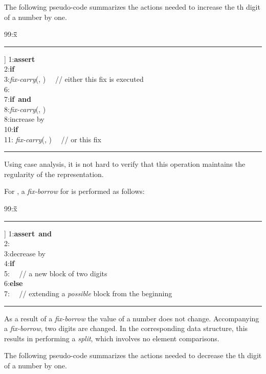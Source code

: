 \documentclass{llncs}
\newenvironment{algorithm}{\par\vspace*{-2mm}\quad\begin{minipage}[t]{0.925\textwidth}\begin{tabbing}99:x\=\quad\=\quad\=\quad\=\quad\=\quad\=\kill}{\end{tabbing}\end{minipage}\par\vspace*{-3mm}}
\newcommand{\ASSERT}{\textbf{assert}\ }
\newcommand{\IF}{\textbf{if}\ }
\newcommand{\ELSE}{\textbf{else}\ }
\newcommand{\AND}{\textbf{and}\ }
\begin{document}
The following pseudo-code summarizes the actions needed to increase
the th digit of a number by one.

\begin{center}
\begin{algorithm}
\rule[6pt]{\textwidth}{0.45pt}\-6pt]
1:\>\ASSERT \\
2:\>\IF \\
3:\>\>\textit{fix-carry}(, )
~~// either this fix is executed\\
6:\>\\
7:\>\IF  \AND \\
8:\>\>\textit{fix-carry}(, )\\
8:\>increase  by \\
10:\>\IF \\
11:\>\> \textit{fix-carry}(,
) ~~// or this fix\\
\rule[6pt]{\textwidth}{0.45pt}
\end{algorithm}
\end{center}

\noindent
Using case analysis, it is not hard to verify that this operation maintains the
regularity of the representation.

For , a \emph{fix-borrow} for  is performed as follows: 

\begin{center}
\begin{algorithm}
\rule[6pt]{\textwidth}{0.45pt}\-6pt]
1:\>\ASSERT  \AND \\
2:\>\\
3:\>decrease  by \\
4:\>\IF \\ 
5:\>\>  ~~// a new block of two digits\\
6:\>\ELSE\\
7:\>\> ~~// extending a \emph{possible} block from the beginning\\ 
\rule[6pt]{\textwidth}{0.45pt}
\end{algorithm}
\end{center}

\noindent
As a result of a {\it fix-borrow} the value of a number does not change.
Accompanying a {\it fix-borrow}, two digits are changed. In the
corresponding data structure, this results in performing a
\emph{split}, which involves no element comparisons.

The following pseudo-code summarizes the actions needed to decrease
the th digit of a number by one.
\end{document}
